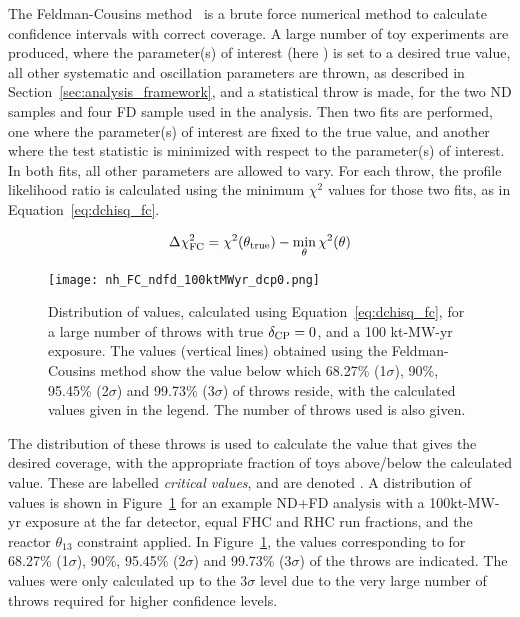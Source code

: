 The Feldman-Cousins method~\cite{Feldman:1997qc} is a brute force numerical method to calculate confidence intervals with correct coverage. A large number of toy experiments are produced, where the parameter(s) of interest (here \deltacp) is set to a desired true value, all other systematic and oscillation parameters are thrown, as described in Section~\ref{sec:analysis_framework}, and a statistical throw is made, for the two ND samples and four FD sample used in the analysis. Then two fits are performed, one where the parameter(s) of interest are fixed to the true value, and another where the test statistic is minimized with respect to the parameter(s) of interest. In both fits, all other parameters are allowed to vary. For each throw, the profile likelihood ratio \dchisqFC is calculated using the minimum $\chi^{2}$ values for those two fits, as in Equation~\ref{eq:dchisq_fc}.
\begin{linenomath*}
  \begin{equation}
    \Delta\chi^{2}_{\mathrm{FC}} = \chi^{2}(\theta_{\mathrm{true}}) - \min_{\theta}\chi^{2}(\theta)
    \label{eq:dchisq_fc}
  \end{equation}
\end{linenomath*}
\begin{figure}[htbp]
  \centering
  \texttt{[image: nh\_FC\_ndfd\_100ktMWyr\_dcp0.png]}
  \caption{Distribution of \dchisqFC values, calculated using Equation~\ref{eq:dchisq_fc}, for a large number of throws with true $\delta_{\rm CP} = 0$, and a 100 kt-MW-yr exposure. The \dchisqcrit values (vertical lines) obtained using the Feldman-Cousins method show the \dchisqFC value below which 68.27\% (1$\sigma$), 90\%, 95.45\% (2$\sigma$) and 99.73\% (3$\sigma$) of throws reside, with the calculated values given in the legend. The number of throws used is also given.}
  \label{fig:fc_throws}
\end{figure}
The distribution of these throws is used to calculate the \dchisqFC value that gives the desired coverage, with the appropriate fraction of toys above/below the calculated value. These are labelled {\it critical values}, and are denoted \dchisqcrit. A distribution of \dchisqFC values is shown in Figure~\ref{fig:fc_throws} for an example ND+FD analysis with a 100kt-MW-yr exposure at the far detector, equal FHC and RHC run fractions, and the reactor $\theta_{13}$ constraint applied. In Figure~\ref{fig:fc_throws}, the \dchisqcrit values corresponding to for 68.27\% (1$\sigma$), 90\%, 95.45\% (2$\sigma$) and 99.73\% (3$\sigma$) of the throws are indicated. The \dchisqcrit values were only calculated up to the 3$\sigma$ level due to the very large number of throws required for higher confidence levels.


